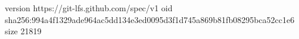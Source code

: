 version https://git-lfs.github.com/spec/v1
oid sha256:994a4f1329ade964ac5dd134e3ed0095d3f1d745a869b81fb08295bca52cc1e6
size 21819
